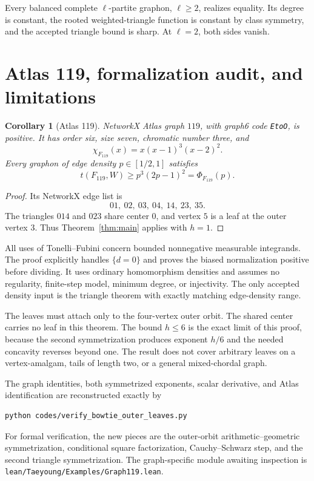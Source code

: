 \documentclass[11pt]{article}
\newtheorem{corollary}[theorem]{Corollary}
\begin{document}
Every balanced complete $\ell$-partite graphon, $\ell\geq2$, realizes
equality.  Its degree is constant, the rooted weighted-triangle function is
constant by class symmetry, and the accepted triangle bound is sharp.  At
$\ell=2$, both sides vanish.


\section{Atlas 119, formalization audit, and limitations}

\begin{corollary}[Atlas 119]\label{cor:atlas119}
NetworkX Atlas graph $119$, with graph6 code \texttt{EtoO}, is positive.  It
has order six, size seven, chromatic number three, and
\[
 \chi_{F_{119}}(x)=x(x-1)^3(x-2)^2.
\]
Every graphon of edge density $p\in[1/2,1]$ satisfies
\[
 t(F_{119},W)\geq p^3(2p-1)^2=\Phi_{F_{119}}(p).
\]
\end{corollary}

\begin{proof}
Its NetworkX edge list is
\[
 01,\ 02,\ 03,\ 04,\ 14,\ 23,\ 35.
\]
The triangles $014$ and $023$ share center $0$, and vertex $5$ is a leaf at
the outer vertex $3$.  Thus Theorem~\ref{thm:main} applies with $h=1$.
\end{proof}

All uses of Tonelli--Fubini concern bounded nonnegative measurable
integrands.  The proof explicitly handles $\{d=0\}$ and proves the biased
normalization positive before dividing.  It uses ordinary homomorphism
densities and assumes no regularity, finite-step model, minimum degree, or
injectivity.  The only accepted density input is the triangle theorem with
exactly matching edge-density range.

The leaves must attach only to the four-vertex outer orbit.  The shared
center carries no leaf in this theorem.  The bound $h\leq6$ is the exact
limit of this proof, because the second symmetrization produces exponent
$h/6$ and the needed concavity reverses beyond one.  The result does not
cover arbitrary leaves on a vertex-amalgam, tails of length two, or a general
mixed-chordal graph.

The graph identities, both symmetrized exponents, scalar derivative, and
Atlas identification are reconstructed exactly by
\begin{verbatim}
python codes/verify_bowtie_outer_leaves.py
\end{verbatim}
For formal verification, the new pieces are the outer-orbit
arithmetic--geometric symmetrization, conditional square factorization,
Cauchy--Schwarz step, and the second triangle symmetrization.  The
graph-specific module awaiting inspection is
\texttt{lean/Taeyoung/Examples/Graph119.lean}.
\end{document}
